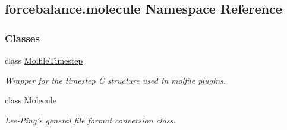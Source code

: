 \hypertarget{namespaceforcebalance_1_1molecule}{\subsection{forcebalance.\-molecule Namespace Reference}
\label{namespaceforcebalance_1_1molecule}
}
\subsubsection*{Classes}
\begin{DoxyCompactItemize}
\item 
class \hyperlink{classforcebalance_1_1molecule_1_1MolfileTimestep}{Molfile\-Timestep}
\begin{DoxyCompactList}\small\item\em Wrapper for the timestep C structure used in molfile plugins. \end{DoxyCompactList}\item 
class \hyperlink{classforcebalance_1_1molecule_1_1Molecule}{Molecule}
\begin{DoxyCompactList}\small\item\em Lee-\/\-Ping's general file format conversion class. \end{DoxyCompactList}\end{DoxyCompactItemize}
